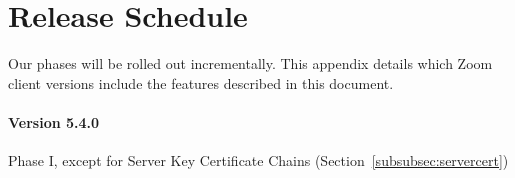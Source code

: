 \section{Release Schedule}
\label{appendix:releases}
Our phases will be rolled out incrementally. This appendix details which Zoom client versions include the features described in this document.

\paragraph{Version 5.4.0}
Phase I, except for Server Key Certificate Chains (Section~\ref{subsubsec:servercert})
